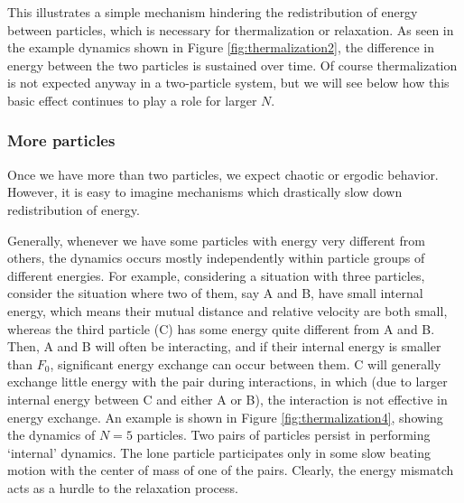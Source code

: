 \documentclass[onecolumn,pra]{revtex4-1}
\begin{document}
This illustrates a simple mechanism hindering the redistribution of energy between particles, which
is necessary for thermalization or relaxation.  As seen in the example dynamics shown in Figure
\ref{fig:thermalization2}, the difference in energy between the two particles is sustained over
time.  Of course thermalization is not expected anyway in a two-particle system, but we will see
below how this basic effect continues to play a role for larger $N$.



\subsubsection{More particles}

Once we have more than two particles, we expect chaotic or ergodic behavior.  However, it is easy to
imagine mechanisms which drastically slow down redistribution of energy.

Generally, whenever we have some particles with energy very different from others, the dynamics
occurs mostly independently within particle groups of different energies.  For example, considering
a situation with three particles, consider the situation where two of them, say A and B, have small
internal energy, which means their mutual distance and relative velocity are both small, whereas the
third particle (C) has some energy quite different from A and B.
%
Then, A and B will often be interacting, and if their internal energy is smaller than $F_0$,
significant energy exchange can occur between them.  C will generally exchange little energy with
the pair during interactions, in which (due to larger internal energy between C and either A or B),
the interaction is not effective in energy exchange.
%
An example is shown in Figure \ref{fig:thermalization4}, showing the dynamics of $N=5$ particles.
Two pairs of particles persist in performing `internal' dynamics.  The lone particle participates
only in some slow beating motion with the center of mass of one of the pairs.  Clearly, the energy
mismatch acts as a hurdle to the relaxation process.
\end{document}

